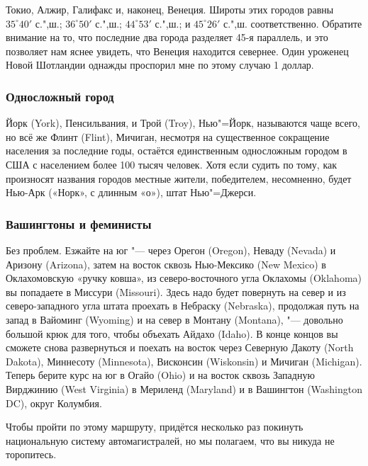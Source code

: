 \documentclass[twoside]{book}
\begin{document}
Токио, Алжир, Галифакс и, наконец, Венеция.
Широты этих городов равны
$35^\circ 40'$ с.",ш.; $36^\circ 50'$ с.",ш.; $44^\circ 53'$ с.",ш.; и $45^\circ 26'$ с.",ш. соответственно.
Обратите внимание на то, что последние два города разделяет 45-я параллель, и это позволяет нам яснее увидеть, что Венеция находится севернее.
Один уроженец Новой Шотландии однажды проспорил мне по этому случаю 1 доллар.
\heart

\subsubsection*{Односложный город}%

Йорк (York), Пенсильвания, и Трой (Troy), Нью"=Йорк, называются чаще
всего, но всё же Флинт (Flint), Мичиган, несмотря на существенное сокращение населения за последние годы, остаётся единственным односложным городом в США с населением более 100 тысяч человек.
Хотя если судить по тому, как произносят названия городов местные жители, победителем, несомненно, будет Нью-Арк («Норк», с длинным «о»), штат Нью"=Джерси.%
\heart

\subsubsection*{Вашингтоны и феминисты} %

{\sloppy 

Без проблем.
Езжайте на юг "--- через Орегон (Oregon), 
Неваду (Nevada) 
и Аризону (Arizona), 
затем на восток сквозь Нью-Мексико (New Mexico) 
в Оклахомовскую «ручку ковша», из северо-восточного угла Оклахомы (Oklahoma) 
вы попадаете в Миссури (Mis\-sou\-ri).
Здесь надо будет повернуть на север и из северо-западного угла штата проехать в Небраску (Nebraska), продолжая путь на запад в Вайоминг (Wyoming) и на север в Монтану (Montana), "--- довольно большой крюк для того, чтобы объехать Айдахо (Idaho).
В конце концов вы сможете снова развернуться и поехать на восток через Северную Дакоту (North Dakota), 
Миннесоту (Minnesota), 
Висконсин (Wiskonsin) 
и Мичиган (Michigan).
Теперь берите курс на юг в Огайо (Ohio) и на восток сквозь Западную Вирджинию (West Virginia) в Мериленд (Maryland) и в Вашингтон (Washington DC), округ Колумбия.\heart
 
}

\medskip

Чтобы пройти по этому маршруту, придётся несколько раз 
покинуть национальную систему автомагистралей, но мы полагаем, что вы никуда не торопитесь.
\end{document}
